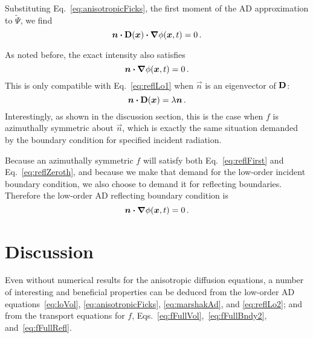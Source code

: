 Substituting Eq.~\eqref{eq:anisotropicFicks}, the first moment of the AD
approximation to $\tilde\Psi$, we find
\begin{equation}\label{eq:reflLo1}
  \bm{n} \bm{\cdot} \mathbf{D}(\bm{x}) \bm{\cdot} \bm{\nabla} \phi(\bm{x}, t) = 0\,.
\end{equation}

As noted before, the exact intensity also satisfies
\begin{equation}\label{eq:reflZeroth}
  \bm{n}\bm{\cdot}\bm{\nabla} \phi(\bm{x}, t) = 0 \,.
\end{equation}
This is only compatible with Eq.~\eqref{eq:reflLo1} when $\vec{n}$ is an
eigenvector of $\mathbf{D}$:
\begin{equation*}
  \bm{n} \bm{\cdot} \mathbf{D}(\bm{x}) = \lambda \bm{n}\,.
\end{equation*}
Interestingly, as shown in the discussion section, this is the case when $f$ is
azimuthally symmetric about
$\vec{n}$, which is exactly the same situation demanded by the boundary
condition for specified incident radiation.

Because an azimuthally symmetric $f$ will satisfy both Eq.~\eqref{eq:reflFirst}
and Eq.~\eqref{eq:reflZeroth}, and because we make that demand for the low-order
incident boundary condition, we also choose to demand it for reflecting
boundaries. Therefore the low-order AD reflecting boundary condition is
\begin{equation}\label{eq:reflLo2}
  \bm{n} \bm{\cdot} \bm{\nabla} \phi(\bm{x}, t) = 0\,.
\end{equation}



\section{Discussion}
Even without numerical results for the anisotropic diffusion equations, a
number of interesting and beneficial properties can be deduced from the
low-order AD equations~\eqref{eq:loVol}, \eqref{eq:anisotropicFicks}, 
\eqref{eq:marshakAd}, and \eqref{eq:reflLo2}; and from the transport equations
for $f$, Eqs.~\eqref{eq:fFullVol},~\eqref{eq:fFullBndy2},
and~\eqref{eq:fFullRefl}.

